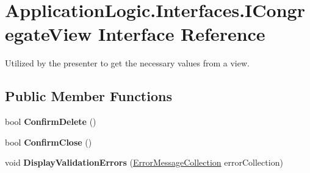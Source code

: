 \hypertarget{interface_application_logic_1_1_interfaces_1_1_i_congregate_view}{
\section{ApplicationLogic.Interfaces.ICongregateView Interface Reference}
\label{interface_application_logic_1_1_interfaces_1_1_i_congregate_view}
}


Utilized by the presenter to get the necessary values from a view.  


\subsection*{Public Member Functions}
\begin{DoxyCompactItemize}
\item 
\hypertarget{interface_application_logic_1_1_interfaces_1_1_i_congregate_view_aab959fda7a8e5861d399d44ea18e5dfd}{
bool {\bfseries ConfirmDelete} ()}
\label{interface_application_logic_1_1_interfaces_1_1_i_congregate_view_aab959fda7a8e5861d399d44ea18e5dfd}

\item 
\hypertarget{interface_application_logic_1_1_interfaces_1_1_i_congregate_view_a3aa85910fca5aa9d3e20b4dbb81b6490}{
bool {\bfseries ConfirmClose} ()}
\label{interface_application_logic_1_1_interfaces_1_1_i_congregate_view_a3aa85910fca5aa9d3e20b4dbb81b6490}

\item 
\hypertarget{interface_application_logic_1_1_interfaces_1_1_i_congregate_view_af76138dd17dc0edf8af4d4b44d33489e}{
void {\bfseries DisplayValidationErrors} (\hyperlink{class_application_logic_1_1_model_1_1_error_message_collection}{ErrorMessageCollection} errorCollection)}
\label{interface_application_logic_1_1_interfaces_1_1_i_congregate_view_af76138dd17dc0edf8af4d4b44d33489e}

\end{DoxyCompactItemize}
